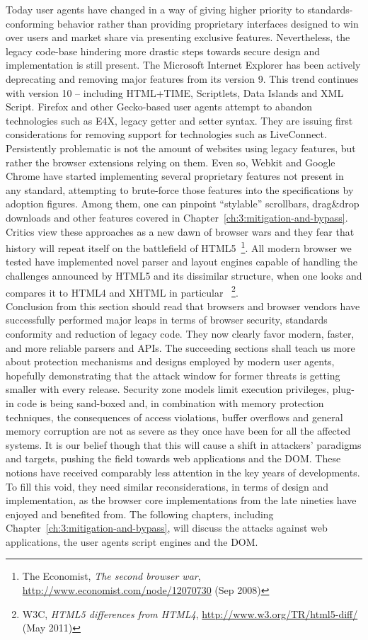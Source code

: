     Today user agents have changed in a way of giving higher priority to standards-conforming behavior rather than providing proprietary interfaces designed to win over users and market share via presenting exclusive features. Nevertheless, the legacy code-base hindering more drastic steps towards secure design and implementation is still present. The Microsoft Internet Explorer has been actively deprecating and removing major features from its version 9. This trend continues with version 10 -- including HTML+TIME, Scriptlets, Data Islands and XML Script. Firefox and other Gecko-based user agents attempt to abandon technologies such as E4X, legacy getter and setter syntax. They are issuing first considerations for removing support for technologies such as LiveConnect. Persistently problematic is not the amount of websites using legacy features, but rather the browser extensions relying on them. Even so, Webkit and Google Chrome have started implementing several proprietary features not present in any 
standard, attempting to brute-force those features into the specifications by adoption figures. Among them, one can pinpoint ``stylable'' scrollbars, drag\&drop downloads and other features covered in Chapter~\ref{ch:3:mitigation-and-bypass}. Critics view these approaches as a new dawn of browser wars and they fear that history will repeat itself on the battlefield of HTML5~\footnote{The Economist, \textit{The second browser war}, \url{http://www.economist.com/node/12070730} (Sep 2008)}. All modern browser we tested have implemented novel parser and layout engines capable of handling the challenges announced by HTML5 and its dissimilar structure, when one looks and compares it to HTML4 and XHTML in particular ~\footnote{W3C, \textit{HTML5 differences from HTML4}, \url{http://www.w3.org/TR/html5-diff/} (May 2011)}.\\

    Conclusion from this section should read that browsers and browser vendors have successfully performed major leaps in terms of browser security, standards conformity and reduction of legacy code. They now clearly favor modern, faster, and more reliable parsers and APIs. The succeeding sections shall teach us more about protection mechanisms and designs employed by modern user agents, hopefully demonstrating that the attack window for former threats is getting smaller with every release. Security zone models limit execution privileges, plug-in code is being sand-boxed and, in combination with memory protection techniques, the consequences of access violations, buffer overflows and general memory corruption are not as severe as they once have been for all the affected systems. It is our belief though that this will cause a shift in attackers' paradigms and targets, pushing the field towards web applications and the DOM. These notions have received comparably less attention in the key years of developments. 
To fill this void, they need similar reconsiderations, in terms of design and implementation, as the browser core implementations from the late nineties have enjoyed and benefited from. The following chapters, including Chapter~\ref{ch:3:mitigation-and-bypass}, will discuss the attacks against web applications, the user agents script engines and the DOM.


